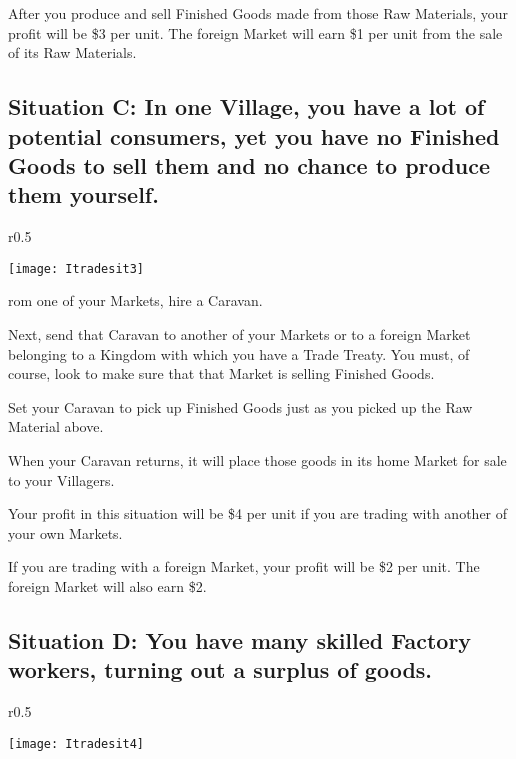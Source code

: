 After you produce and sell Finished Goods made from those Raw Materials, your profit will be \$3 per unit. The foreign Market will earn \$1 per unit from the sale of its Raw Materials.

\subsection{\textsf{Situation C: In one Village, you have a lot of potential consumers, yet you have no Finished Goods to sell them and no chance to produce them yourself.}}

\begin{wrapfigure}{r}{0.5\textwidth}
    \vspace{-20pt}
    \begin{center}
        \texttt{[image: Itradesit3]} %
    \end{center}
    \vspace{-20pt}
\end{wrapfigure}

rom one of your Markets, hire a Caravan.

Next, send that Caravan to another of your Markets or to a foreign Market belonging to a Kingdom with which you have a Trade Treaty. You must, of course, look to make sure that that Market is selling Finished Goods.

Set your Caravan to pick up Finished Goods just as you picked up the Raw Material above.

When your Caravan returns, it will place those goods in its home Market for sale to your Villagers.

Your profit in this situation will be \$4 per unit if you are trading with another of your own Markets.

If you are trading with a foreign Market, your profit will be \$2 per unit. The foreign Market will also earn \$2.

\subsection{\textsf{Situation D: You have many skilled Factory workers, turning out a surplus of goods.}}

\begin{wrapfigure}{r}{0.5\textwidth}
    \vspace{-20pt}
    \begin{center}
        \texttt{[image: Itradesit4]} %
    \end{center}
    \vspace{-20pt}
\end{wrapfigure}

